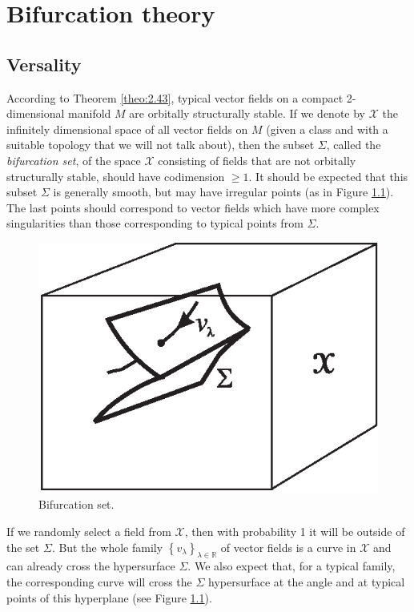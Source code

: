 \chapter{Bifurcation theory}
\section{Versality}

According to Theorem \ref{theo:2.43}, typical vector fields on a compact 2-dimensional manifold $M$ are orbitally structurally stable. If we denote by $\mathcal{X}$ the infinitely dimensional space of all vector fields on $M$ (given a class and with a suitable topology that we will not talk about), then the subset $\Sigma$, called the \textit{bifurcation set}, of the space $\mathcal{X}$  consisting of fields that are not orbitally structurally stable, should have codimension $\geq 1$. It should be expected that this subset $\Sigma$ is generally smooth, but may have irregular points (as in Figure \ref{fig:3.1}). The last points should correspond to vector fields which have more complex singularities than those corresponding to typical points from $\Sigma$.

\begin{figure}[!ht]
	\centering
	\includegraphics [scale=1]{jtr31}
	\caption{Bifurcation set.}
	\label{fig:3.1}
\end{figure}

If we randomly select a field from $\mathcal{X}$, then with probability 1 it will be outside of the set $\Sigma$. But the whole family $\left\{ v_{\lambda }\right\} _{\lambda \in \mathbb{R}}$ of vector fields is a curve in $\mathcal{X}$ and can already cross the hypersurface $\Sigma$. We also expect that, for a typical family, the corresponding curve will cross the $\Sigma$ hypersurface at the angle and at typical points of this hyperplane (see Figure \ref{fig:3.1}).

